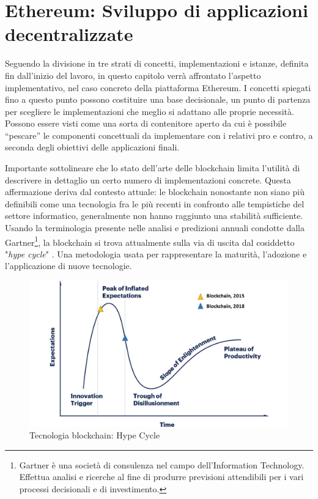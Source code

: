 \chapter{Ethereum: Sviluppo di applicazioni decentralizzate}
\label{ch:ethereum}

Seguendo la divisione in tre strati di concetti, implementazioni e istanze, definita fin dall'inizio del lavoro, in questo capitolo verrà affrontato l'aspetto implementativo, nel caso concreto della piattaforma Ethereum. I concetti spiegati fino a questo punto possono costituire una base decisionale, un punto di partenza per scegliere le implementazioni che meglio si adattano alle proprie necessità. Possono essere visti come una sorta di contenitore aperto da cui è possibile “pescare” le componenti concettuali da implementare con i relativi pro e contro, a seconda degli obiettivi delle applicazioni finali. 

Importante sottolineare che lo stato dell'arte delle blockchain limita l’utilità di descrivere in dettaglio un certo numero di implementazioni concrete. Questa affermazione deriva dal contesto attuale: le blockchain nonostante non siano più definibili come una tecnologia fra le più recenti in confronto alle tempistiche del settore informatico, generalmente non hanno raggiunto una stabilità sufficiente. Usando la terminologia presente nelle analisi e predizioni annuali condotte dalla Gartner\footnote{Gartner è una società di consulenza nel campo dell'Information Technology. Effettua analisi e ricerche al fine di produrre previsioni attendibili per i vari processi decisionali e di investimento.}, la blockchain si trova attualmente sulla via di uscita dal cosiddetto "\emph{hype cycle}" \smallskip {}. Una metodologia usata per rappresentare la maturità, l'adozione e l'applicazione di nuove tecnologie.

\begin{figure}[H]
\centering
\includegraphics[width=1\textwidth]{immagini/blockchainHype.png}
\caption{Tecnologia blockchain: Hype Cycle}
\label{fig:HypeCycleBlockchain}
\end{figure}

